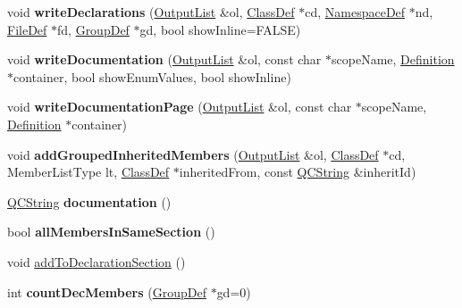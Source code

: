 \begin{DoxyCompactItemize}
\item 
\hypertarget{class_member_group_ae837850dba6810b86f437b10a4420a74}{void {\bfseries write\-Declarations} (\hyperlink{class_output_list}{Output\-List} \&ol, \hyperlink{class_class_def}{Class\-Def} $\ast$cd, \hyperlink{class_namespace_def}{Namespace\-Def} $\ast$nd, \hyperlink{class_file_def}{File\-Def} $\ast$fd, \hyperlink{class_group_def}{Group\-Def} $\ast$gd, bool show\-Inline=F\-A\-L\-S\-E)}\label{class_member_group_ae837850dba6810b86f437b10a4420a74}

\item 
\hypertarget{class_member_group_a0af025345da36ab191ed6154f6dc48fe}{void {\bfseries write\-Documentation} (\hyperlink{class_output_list}{Output\-List} \&ol, const char $\ast$scope\-Name, \hyperlink{class_definition}{Definition} $\ast$container, bool show\-Enum\-Values, bool show\-Inline)}\label{class_member_group_a0af025345da36ab191ed6154f6dc48fe}

\item 
\hypertarget{class_member_group_a94ed17cbea99b53687b20c95c414dfe9}{void {\bfseries write\-Documentation\-Page} (\hyperlink{class_output_list}{Output\-List} \&ol, const char $\ast$scope\-Name, \hyperlink{class_definition}{Definition} $\ast$container)}\label{class_member_group_a94ed17cbea99b53687b20c95c414dfe9}

\item 
\hypertarget{class_member_group_a183b07c421376d2c3e714291c1ccecab}{void {\bfseries add\-Grouped\-Inherited\-Members} (\hyperlink{class_output_list}{Output\-List} \&ol, \hyperlink{class_class_def}{Class\-Def} $\ast$cd, Member\-List\-Type lt, \hyperlink{class_class_def}{Class\-Def} $\ast$inherited\-From, const \hyperlink{class_q_c_string}{Q\-C\-String} \&inherit\-Id)}\label{class_member_group_a183b07c421376d2c3e714291c1ccecab}

\item 
\hypertarget{class_member_group_adafaa3fbeebd74c6772763df63ae8682}{\hyperlink{class_q_c_string}{Q\-C\-String} {\bfseries documentation} ()}\label{class_member_group_adafaa3fbeebd74c6772763df63ae8682}

\item 
\hypertarget{class_member_group_ac0a2eb5a741a4a475c604e2ee7aff039}{bool {\bfseries all\-Members\-In\-Same\-Section} ()}\label{class_member_group_ac0a2eb5a741a4a475c604e2ee7aff039}

\item 
void \hyperlink{class_member_group_ae11fa89cfea3d77e1a73b662c3046588}{add\-To\-Declaration\-Section} ()
\item 
\hypertarget{class_member_group_aee5e3e59f983ea15ff1167278f216369}{int {\bfseries count\-Dec\-Members} (\hyperlink{class_group_def}{Group\-Def} $\ast$gd=0)}\label{class_member_group_aee5e3e59f983ea15ff1167278f216369}


\end{DoxyCompactItemize}
